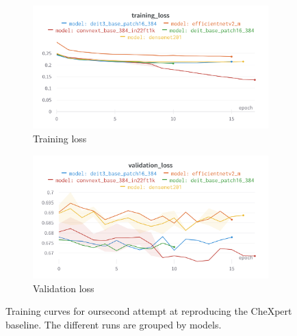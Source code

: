 \documentclass[11pt]{article}
\begin{document}
                \begin{figure}[H]
                     \centering
                     \begin{subfigure}[b]{0.45\textwidth}
                         \centering
                         \includegraphics[width=\textwidth]{plots/chexpert_training_loss2}
                         \caption{Training loss}
                         \vspace{4ex}
                         \label{fig:chexpert_training_loss2}
                     \end{subfigure}
                     \hfill
                     \begin{subfigure}[b]{0.45\textwidth}
                         \centering
                         \includegraphics[width=\textwidth]{plots/chexpert_validation_loss2}
                         \caption{Validation loss}
                         \vspace{4ex}
                         \label{fig:chexpert_validation_loss2}
                     \end{subfigure}
                     \label{fig:training_curves2}
                     \caption{Training curves for oursecond attempt at reproducing the CheXpert baseline. The different runs are grouped by models.}
                \end{figure}
\end{document}
